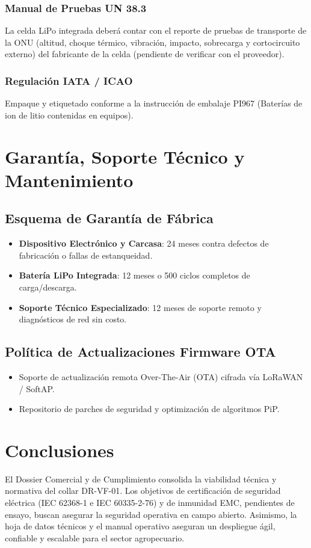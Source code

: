 \subsubsection{Manual de Pruebas UN 38.3}

La celda LiPo integrada deberá contar con el reporte de pruebas de transporte de la ONU (altitud, choque térmico, vibración, impacto, sobrecarga y cortocircuito externo) del fabricante de la celda (pendiente de verificar con el proveedor).

\subsubsection{Regulación IATA / ICAO}

Empaque y etiquetado conforme a la instrucción de embalaje PI967 (Baterías de ion de litio contenidas en equipos).

\section{Garantía, Soporte Técnico y Mantenimiento}

\subsection{Esquema de Garantía de Fábrica}

\begin{itemize}[leftmargin=*]
    \item \textbf{Dispositivo Electrónico y Carcasa}: 24 meses contra defectos de fabricación o fallas de estanqueidad.
    \item \textbf{Batería LiPo Integrada}: 12 meses o 500 ciclos completos de carga/descarga.
    \item \textbf{Soporte Técnico Especializado}: 12 meses de soporte remoto y diagnósticos de red sin costo.
\end{itemize}

\subsection{Política de Actualizaciones Firmware OTA}

\begin{itemize}[leftmargin=*]
    \item Soporte de actualización remota Over-The-Air (OTA) cifrada vía LoRaWAN / SoftAP.
    \item Repositorio de parches de seguridad y optimización de algoritmos PiP.
\end{itemize}

\section{Conclusiones}

El Dossier Comercial y de Cumplimiento consolida la viabilidad técnica y normativa del collar DR-VF-01. Los objetivos de certificación de seguridad eléctrica (IEC 62368-1 e IEC 60335-2-76) y de inmunidad EMC, pendientes de ensayo, buscan asegurar la seguridad operativa en campo abierto. Asimismo, la hoja de datos técnicos y el manual operativo aseguran un despliegue ágil, confiable y escalable para el sector agropecuario.